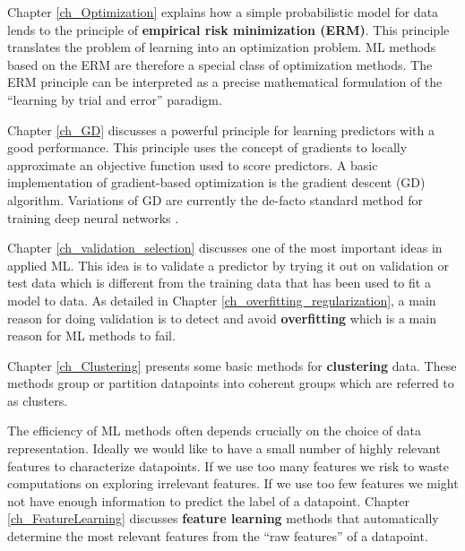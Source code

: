 \documentclass[12pt]{report}
\begin{document}
Chapter \ref{ch_Optimization} explains how a simple probabilistic 
model for data lends to the principle of {\bf empirical risk minimization (ERM)}. 
This principle translates the problem of learning into an optimization problem. 
ML methods based on the ERM are therefore a special class of 
optimization methods. The ERM principle can be interpreted as 
a precise mathematical formulation of the ``learning by trial and error'' paradigm. 

Chapter \ref{ch_GD} discusses a powerful principle for learning 
predictors with a good performance. This principle uses the concept 
of gradients to locally approximate an objective function used 
to score predictors. A basic implementation of gradient-based 
optimization is the gradient descent (GD) algorithm. Variations 
of GD are currently the de-facto standard method for training 
deep neural networks \cite{Goodfellow-et-al-2016}. 

Chapter \ref{ch_validation_selection} discusses one of the most 
important ideas in applied ML. This idea is to validate a predictor 
by trying it out on validation or test data which is different from 
the training data that has been used to fit a model to data. As 
detailed in Chapter \ref{ch_overfitting_regularization}, a main 
reason for doing validation is to detect and avoid {\bf overfitting} 
which is a main reason for ML methods to fail. 

Chapter \ref{ch_Clustering} presents some basic methods for {\bf clustering} 
data. These methods group or partition datapoints into 
coherent groups which are referred to as clusters. 

The efficiency of ML methods often depends crucially on the choice 
of data representation. Ideally we would like to have a small number 
of highly relevant features to characterize datapoints. If we use too 
many features we risk to waste computations on exploring irrelevant 
features. If we use too few features we might not have enough information 
to predict the label of a datapoint. Chapter \ref{ch_FeatureLearning} 
discusses {\bf feature learning} methods that automatically determine 
the most relevant features from the ``raw features'' of a datapoint. 

\end{document}
